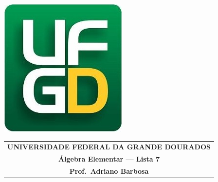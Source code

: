 \documentclass[a4paper,5pt]{amsbook}
\begin{document}
\thispagestyle{empty}
\pagestyle{empty}
\begin{minipage}[h]{0.14\textwidth}
	\includegraphics[scale=0.24]{../ufgd.png}
\end{minipage}
\begin{minipage}[h]{\textwidth}
\begin{tabular}{c}
{{\bf UNIVERSIDADE FEDERAL DA GRANDE DOURADOS}}\\
{{\bf \'Algebra Elementar --- Lista 7}}\\
{{\bf Prof.\ Adriano Barbosa}}\\
\end{tabular}
\vspace{-0.45cm}
%
\end{minipage}

\end{document}
